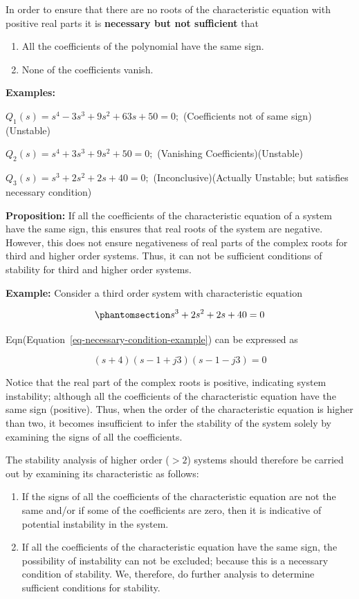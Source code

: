\documentclass[
  14pt,
  a4paper,
  oneside,
  open=any,
  a4paper,
  14pt]{report}
\begin{document}
In order to ensure that there are no roots of the characteristic
equation with positive real parts it is \textbf{necessary but not
sufficient} that

\begin{enumerate}
\def\labelenumi{\arabic{enumi}.}
\item
  All the coefficients of the polynomial have the same sign.
\item
  None of the coefficients vanish.
\end{enumerate}

\textbf{Examples:}

\(Q_1(s) = s^4 - 3s^3 + 9s^2 + 63s + 50 = 0;\) (Coefficients not of same
sign)(Unstable)

\(Q_2(s) = s^4 + 3s^3 + 9s^2 + 50 = 0;\) (Vanishing
Coefficients)(Unstable)

\(Q_3(s) = s^3 + 2s^2 + 2s + 40 = 0;\) (Inconclusive)(Actually Unstable;
but satisfies necessary condition)

\textbf{Proposition:} If all the coefficients of the characteristic
equation of a system have the same sign, this ensures that real roots of
the system are negative. However, this does not ensure negativeness of
real parts of the complex roots for third and higher order systems.
Thus, it can not be sufficient conditions of stability for third and
higher order systems.

\textbf{Example:} Consider a third order system with characteristic
equation

\begin{equation}\phantomsection\label{eq-necessary-condition-example}{
    s^3 + 2s^2 + 2s + 40 = 0
}\end{equation}

Eqn(Equation~\ref{eq-necessary-condition-example}) can be expressed as

\[
    (s+4)(s-1+j3)(s-1-j3) = 0
\]

Notice that the real part of the complex roots is positive, indicating
system instability; although all the coefficients of the characteristic
equation have the same sign (positive). Thus, when the order of the
characteristic equation is higher than two, it becomes insufficient to
infer the stability of the system solely by examining the signs of all
the coefficients.

The stability analysis of higher order (\(>2\)) systems should therefore
be carried out by examining its characteristic as follows:

\begin{enumerate}
\def\labelenumi{\arabic{enumi}.}
\item
  If the signs of all the coefficients of the characteristic equation
  are not the same and/or if some of the coefficients are zero, then it
  is indicative of potential instability in the system.
\item
  If all the coefficients of the characteristic equation have the same
  sign, the possibility of instability can not be excluded; because this
  is a necessary condition of stability. We, therefore, do further
  analysis to determine sufficient conditions for stability.
\end{enumerate}
\end{document}
